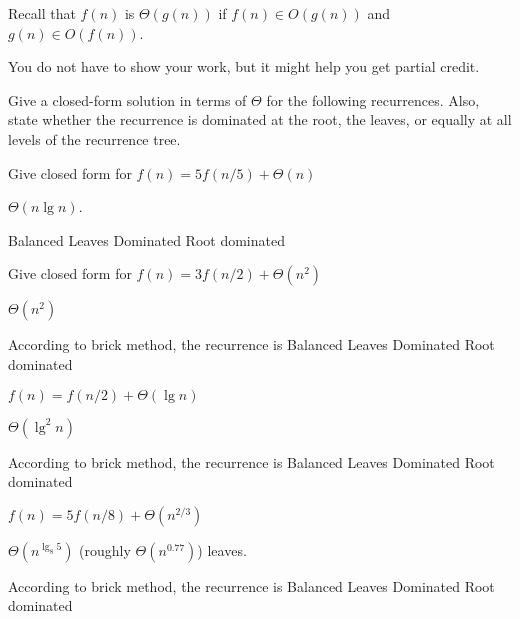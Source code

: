 Recall that $f(n)$ is $\Theta(g(n))$
if $f(n) \in O(g(n))$ and $g(n) \in O(f(n))$.


\begin{note}
You do not have to show your work, but it might help you get partial credit.
\end{note}

\begin{problem}[16.]
Give a closed-form
solution in terms of $\Theta$ for the following recurrences.  Also, state
whether the recurrence is dominated at the root, the leaves, or
equally at all levels of the recurrence tree.


\ask
Give closed form for  
$f(n) = 5f(n/5) + \Theta(n)$


\sol
$\Theta (n \lg n)$.

\onechoice

\choice Balanced
\choice Leaves Dominated
\choice* Root dominated 



\ask
Give closed form for  
$f(n) = 3f(n/2) + \Theta(n^2)$

\sol
$\Theta(n^2)$

\onechoice  According to brick method, the recurrence is
\choice Balanced
\choice Leaves Dominated
\choice* Root dominated

\ask
$f(n) = f(n/2) + \Theta(\lg n)$

\sol
$\Theta (\lg^2 n)$

\onechoice  According to brick method, the recurrence is
\choice* Balanced
\choice Leaves Dominated
\choice Root dominated

\ask
$f(n) = 5f(n/8) +\Theta(n^{2/3})$

\sol
$\Theta(n^{\lg_8 5})$ (roughly $\Theta(n^{0.77})$) leaves.

\onechoice  According to brick method, the recurrence is
\choice Balanced
\choice* Leaves Dominated
\choice Root dominated

\end{problem}


